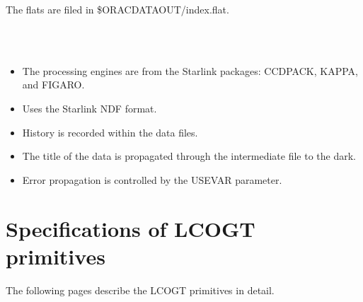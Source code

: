 \documentclass[twoside,11pt]{article}
\newcommand{\xlabel}[1]{}
\renewcommand{\_}{\texttt{\symbol{95}}}
\newcommand{\sstimplementationstatus}[1]{
   \item[{Implementation Status:}] \mbox{} \\[1.3ex] #1}
\newcommand{\sstitemlist}[1]{
  \mbox{} \\
  \vspace{-3.5ex}
  \begin{itemize}
     #1
  \end{itemize}
}
\newcommand{\sstitem}{\item}
\newcommand{\sstimplementationstatus}[1]{
      \item[Implementation Status:] #1
   }
\newcommand{\sstitemlist}[1]{
      \begin{itemize}
         #1
      \end{itemize}
      \\
   }
\newcommand{\sstitem}{\item}
\begin{document}
{{{         \sstitem
         The flats are filed in \$ORAC\_DATA\_OUT/index.flat.
      }
   }
   \sstimplementationstatus{
      \sstitemlist{

         \sstitem
         The processing engines are from the Starlink packages: CCDPACK,
         KAPPA, and FIGARO.

         \sstitem
         Uses the Starlink NDF format.

         \sstitem
         History is recorded within the data files.

         \sstitem
         The title of the data is propagated through the intermediate
         file to the dark.

         \sstitem
         Error propagation is controlled by the USEVAR parameter.
      }
   }
}

\newpage

\section{\xlabel{ap_full_primitives}Specifications of LCOGT primitives\label{ap:full_primitives}}

The following pages describe the LCOGT primitives in detail.


\end{document}
